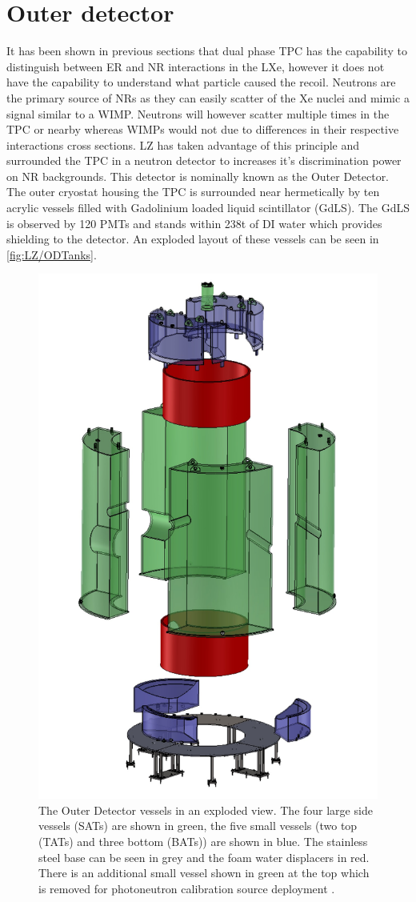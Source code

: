 \section{Outer detector}\label{sec:LZ/LZOD}
It has been shown in previous sections that dual phase TPC has the capability to distinguish between ER and NR interactions in the LXe, however it does not have the capability to understand what particle caused the recoil. Neutrons are the primary source of NRs as they can easily scatter of the Xe nuclei and mimic a signal similar to a WIMP. Neutrons will however scatter multiple times in the TPC or nearby whereas WIMPs would not due to differences in their respective interactions cross sections. LZ has taken advantage of this principle and surrounded the TPC in a neutron detector to increases it's discrimination power on NR backgrounds. This detector is nominally known as the Outer Detector.
The outer cryostat housing the TPC is surrounded near hermetically by ten acrylic vessels filled with  Gadolinium loaded liquid scintillator (GdLS). The GdLS is observed by 120 PMTs and stands within 238t of DI water which provides shielding to the detector. An exploded layout of these vessels can be seen in \autoref{fig:LZ/ODTanks}.
\begin{figure}[!ht]
    \centering
    \includegraphics[width=0.5\linewidth]{figures/LZ/CAD_ODTanks.jpg}
    \caption{The Outer Detector vessels in an exploded view. The four large side vessels (SATs) are shown in green, the five small vessels (two top (TATs) and three bottom (BATs)) are shown in blue. The stainless steel base can be seen in grey and the foam water displacers in red. There is an additional small vessel shown in green at the top which is removed for photoneutron calibration source deployment \cite{LZNIMA}.}
    \label{fig:LZ/ODTanks}
\end{figure}

